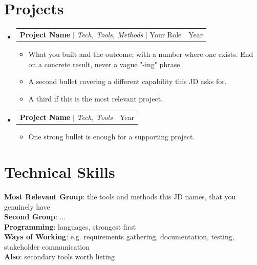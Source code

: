 \documentclass[letterpaper,11pt]{article}
\makeatletter
\newcommand{\resumeItem}[1]{
  \item\small{
    {#1 \vspace{-2pt}}
  }
}
\newcommand{\resumeProjectHeading}[2]{
    \item
    \begin{tabular*}{0.97\textwidth}{l@{\extracolsep{\fill}}r}
      \small#1 & #2 \\
    \end{tabular*}\vspace{-7pt}
}
\newcommand{\resumeSubHeadingListStart}{\begin{itemize}[leftmargin=0.15in, label={}]}
\newcommand{\resumeSubHeadingListEnd}{\end{itemize}}
\newcommand{\resumeItemListStart}{\begin{itemize}}
\newcommand{\resumeItemListEnd}{\end{itemize}\vspace{-5pt}}
\makeatother
\begin{document}
\section{Projects}
    \resumeSubHeadingListStart

      \resumeProjectHeading
          {\textbf{Project Name} $|$ \emph{Tech, Tools, Methods} $|$ Your Role}{Year}
          \resumeItemListStart
            \resumeItem{What you built and the outcome, with a number where one exists. End on a concrete result, never a vague "-ing" phrase.}
            \resumeItem{A second bullet covering a different capability this JD asks for.}
            \resumeItem{A third if this is the most relevant project.}
          \resumeItemListEnd

      \resumeProjectHeading
          {\textbf{Project Name} $|$ \emph{Tech, Tools}}{Year}
          \resumeItemListStart
            \resumeItem{One strong bullet is enough for a supporting project.}
          \resumeItemListEnd

    \resumeSubHeadingListEnd

\section{Technical Skills}
 \begin{itemize}[leftmargin=0.15in, label={}]
    \small{\item{
     \textbf{Most Relevant Group}{: the tools and methods this JD names, that you genuinely have} \\ \vspace{2pt}
     \textbf{Second Group}{: ...} \\ \vspace{2pt}
     \textbf{Programming}{: languages, strongest first} \\ \vspace{2pt}
     \textbf{Ways of Working}{: e.g. requirements gathering, documentation, testing, stakeholder communication} \\ \vspace{2pt}
     \textbf{Also}{: secondary tools worth listing}
    }}
 \end{itemize}
\end{document}
